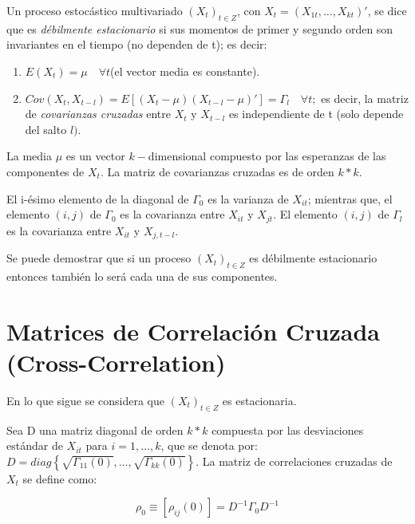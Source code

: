 Un proceso estoc\'{a}stico multivariado ${(X_{t})}_{t\in Z}$, con $X_{t}=(X_{1t},\ldots, X_{kt})'$, se dice que es \textit{d\'{e}bilmente estacionario} si sus momentos de primer y segundo orden son invariantes en el tiempo (no dependen de t); es decir:

\begin{enumerate}
\item $E\left( X_{t} \right)=\mu \quad \forall t$\quad (el vector media es constante).
\item $Cov\left( X_{t}, X_{t-l} \right)=E\left[ \left( X_{t}-\mu \right)\left( X_{t-l}-\mu \right)' \right]=\Gamma_{l} \quad \forall t;$ es decir, la matriz de \textit{covarianzas cruzadas} entre $X_{t}$ y $X_{t-l}$ es independiente de t (solo depende del salto $l)$.
\end{enumerate}

La media $\mu$ es un vector $k-$dimensional compuesto por las esperanzas de las componentes de $X_{t}$. La matriz de covarianzas cruzadas es de orden $k* k$.

El i-\'{e}simo elemento de la diagonal de $\Gamma_{0}$ es la varianza de $X_{it}$; mientras que, el elemento $(i,j)$ de $\Gamma_{0}$ es la covarianza entre $X_{it}$ y $X_{jt}$. El elemento $(i,j)$ de $\Gamma_{l}$ es la covarianza entre $X_{it}$ y $X_{j,t-l}$. 

\begin{observacion}
Se puede demostrar que si un proceso ${(X_{t})}_{t\in Z}$ es d\'{e}bilmente estacionario entonces 
tambi\'{e}n lo ser\'{a} cada una de sus componentes.
\end{observacion}


\section{Matrices de Correlaci\'{o}n Cruzada (Cross-Correlation)}
\label{subsec:mylabel6}

En lo que sigue se considera que ${(X_{t})}_{t\in Z}$ es estacionaria.\newline

Sea D una matriz diagonal de orden $k*k$ compuesta por las desviaciones est\'{a}ndar de $X_{it}$ para $i=1,\ldots, k$, que se denota por: $D=diag\left\{ \sqrt{\Gamma_{11}(0)},\ldots ,\sqrt{\Gamma_{kk}(0)} \right\}$. La matriz de correlaciones cruzadas  de $X_{t}$ se define como:

\[
\rho_{0}\equiv \left[ \rho_{ij}(0) \right]=D^{-1}\Gamma_{0}D^{-1}
\]

